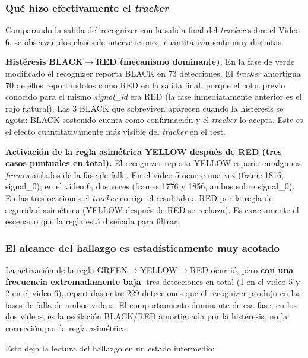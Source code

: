 \subsubsection{Qué hizo efectivamente el \textit{tracker}}

Comparando la salida del recognizer con la salida final del \textit{tracker} sobre el Video 6, se observan dos clases de intervenciones, cuantitativamente muy distintas.

\textbf{Histéresis BLACK$\to$RED (mecanismo dominante).} En la fase de verde modificado el recognizer reporta BLACK en 73 detecciones. El \textit{tracker} amortigua 70 de ellos reportándolos como RED en la salida final, porque el color previo conocido para el mismo \textit{signal\_id} era RED (la fase inmediatamente anterior es el rojo natural). Las 3 BLACK que sobreviven aparecen cuando la histéresis se agota: BLACK sostenido cuenta como confirmación y el \textit{tracker} lo acepta. Este es el efecto cuantitativamente más visible del \textit{tracker} en el test.

\textbf{Activación de la regla asimétrica YELLOW después de RED (tres casos puntuales en total).} El recognizer reporta YELLOW espurio en algunos \textit{frames} aislados de la fase de falla. En el video 5 ocurre una vez (frame 1816, signal\_0); en el video 6, dos veces (frames 1776 y 1856, ambos sobre signal\_0). En las tres ocasiones el \textit{tracker} corrige el resultado a RED por la regla de seguridad asimétrica (YELLOW después de RED se rechaza). Es exactamente el escenario que la regla está diseñada para filtrar.

\subsubsection{El alcance del hallazgo es estadísticamente muy acotado}

La activación de la regla GREEN$\to$YELLOW$\to$RED ocurrió, pero \textbf{con una frecuencia extremadamente baja}: tres detecciones en total (1 en el video 5 y 2 en el video 6), repartidas entre 229 detecciones que el recognizer produjo en las fases de falla de ambos videos. El comportamiento dominante de esa fase, en los dos videos, es la oscilación BLACK/RED amortiguada por la histéresis, no la corrección por la regla asimétrica.

Esto deja la lectura del hallazgo en un estado intermedio:

